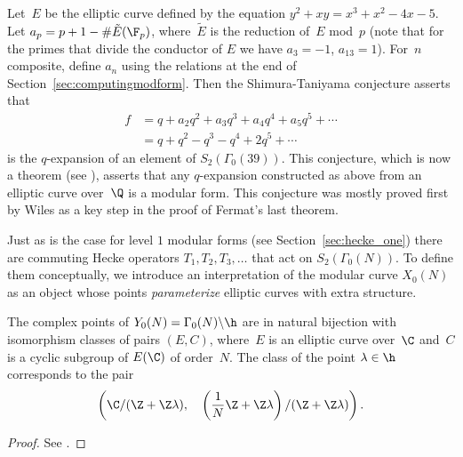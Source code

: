 \begin{example}
Let~$E$ be the elliptic curve defined by the equation
$y^2 + xy = x^3 + x^2 - 4x - 5$.
Let $a_p = p+1-\#\tilde{E}(\F_p)$, where~$\tilde{E}$ 
is the reduction of~$E$ mod~$p$ (note that for the 
primes that divide the conductor of $E$ we have $a_3=-1$, $a_{13}=1$).
For~$n$ composite, define $a_n$ using the relations at the
end of Section~\ref{sec:computingmodform}. 
Then the Shimura-Taniyama conjecture asserts that
\begin{align*}
  f&=q + a_2 q^2 + a_3 q^3 + a_4 q^4 + a_5 q^5 + \cdots\\
   &= q + q^2 - q^3 -q^4 + 2q^5 + \cdots
\end{align*}
is the $q$-expansion of an element of $S_2(\Gamma_0(39))$.
This conjecture,
which is now a theorem (see
\cite{breuil-conrad-diamond-taylor}), asserts that any
$q$-expansion constructed as above from an elliptic 
curve over~$\Q$ is a modular form.    This conjecture was
mostly proved first by Wiles \cite{wiles:fermat} 
as a key step in the proof of Fermat's last theorem. 
\end{example}


Just as is the case for level $1$ modular forms (see
Section~\ref{sec:hecke_one}) there are commuting Hecke operators $T_1,
T_2, T_3, \ldots$ that act on $S_2(\Gamma_0(N))$.  To define them
conceptually, we introduce an interpretation of the modular curve
$X_0(N)$ as an object whose points {\em parameterize} elliptic curves
with extra structure.

\begin{proposition}\label{prop:modulix0n}
  The complex points of 
  $Y_0(N)=\Gamma_0(N)\backslash \h$ are in natural bijection with
  isomorphism classes of pairs $(E,C)$, where~$E$ is an elliptic
  curve over~$\C$ and~$C$ is a cyclic subgroup of $E(\C)$ of
  order~$N$.  The class of the point $\lambda \in \h$ corresponds to
  the pair
$$
  \left(\C/(\Z + \Z  \lambda),
    \quad \left(\frac{1}{N}\Z + \Z\lambda\right)/(\Z +  \Z \lambda)\right).
$$
\end{proposition}
\begin{proof}
See .
\end{proof}

